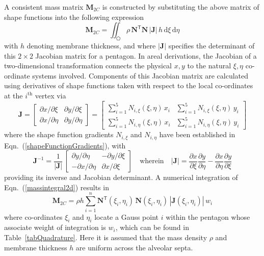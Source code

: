 A consistent mass matrix $\mathbf{M}_{2C}$ is constructed by substituting the above matrix of shape functions into the following expression
\begin{equation}
    \mathbf{M}_{2C} = \iint_{\pentagon} \rho \, \mathbf{N}^{\mathsf{T}} \mathbf{N} \,|\mathbf{J}| \, h \, \mathrm{d} \xi \, \mathrm{d} \eta
    \label{massintegral2d}
\end{equation}
with $h$ denoting membrane thickness, and where $|\mathbf{J}|$ specifies the determinant of this $2 \! \times \! 2$ Jacobian matrix for a pentagon.  In areal derivations, the Jacobian of a two-dimensional transformation connects the physical ${x, y}$ to the natural ${\xi, \eta}$ co-ordinate systems involved.  Components of this Jacobian matrix are calculated using derivatives of shape functions taken with respect to the local co-ordinates at the $i^{\mathrm{th}}$ vertex via
\begin{equation}
\mathbf{J} = 
\begin{bmatrix}
\partial x / \partial\xi & \partial y / \partial\xi \\
\partial x / \partial\eta & \partial y / \partial\eta 
\end{bmatrix}  
= \begin{bmatrix}
\sum\nolimits_{i=1}^5 N_{i,\xi} (\xi,\eta) \, x_i & \sum\nolimits_{i=1}^5 N_{i,\xi} (\xi,\eta) \, y_i \\
\sum\nolimits_{i=1}^5 N_{i,\eta} (\xi,\eta) \, x_i & \sum\nolimits_{i=1}^5 N_{i,\eta} (\xi,\eta) \, y_i
\end{bmatrix}
\end{equation}
where the shape function gradients $N_{i,\xi}$ and $N_{i,\eta}$ have been established in Eqn.~(\ref{shapeFunctionGradients}), with
\begin{equation}
\mathbf{J}^{-1}  = \frac{1}{|\mathbf{J}|} \,
\begin{bmatrix}
\partial y / \partial\eta & - \partial y / \partial\xi \\
- \partial x / \partial\eta & \partial x / \partial\xi
\end{bmatrix} 
\quad \text{wherein} \quad 
| \mathbf{J} | = \frac{\partial x}{\partial \xi} \frac{\partial y}{\partial \eta} - 
\frac{\partial x}{\partial \eta} \frac{\partial y}{\partial \xi}
\label{jacobianpent}
\end{equation}
providing its inverse and Jacobian determinant.  A numerical integration of Eqn.~(\ref{massintegral2d}) results in 
\begin{equation}
    \mathbf{M}_{2C} = \rho h \sum_{i=1}^{n} \mathbf{N}^{\mathsf{T}} ( \xi_i , \eta_i ) \, \mathbf{N} ( \xi_i , \eta_i ) \,|\mathbf{J} ( \xi_i , \eta_i ) | \, w_i
\end{equation}
where co-ordinates $\xi_i$ and $\eta_i$ locate a Gauss point $i$ within the pentagon whose associate weight of integration is $w_i$, which can be found in Table~\ref{tabQuadrature}.  Here it is assumed that the mass density $\rho$ and membrane thickness $h$ are uniform across the alveolar septa.

